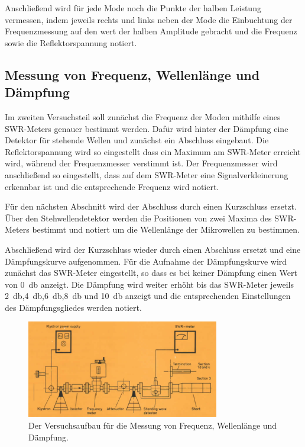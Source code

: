         Anschließend wird für jede Mode noch die Punkte der halben Leistung vermessen, indem jeweils rechts und links neben der Mode die Einbuchtung der Frequenzmessung auf den wert der halben Amplitude gebracht und die Frequenz sowie die Reflektorspannung notiert.
    \subsection{Messung von Frequenz, Wellenlänge und Dämpfung}
        Im zweiten Versuchsteil soll zunächst die Frequenz der Moden mithilfe eines SWR-Meters genauer bestimmt werden.
        Dafür wird hinter der Dämpfung eine Detektor für stehende Wellen und zunächst ein Abschluss eingebaut.
        Die Reflektorspannung wird so eingestellt dass ein Maximum am SWR-Meter erreicht wird, während der Frequenzmesser verstimmt ist.
        Der Frequenzmesser wird anschließend so eingestellt, dass auf dem SWR-Meter eine Signalverkleinerung erkennbar ist und die entsprechende Frequenz wird notiert.

        Für den nächsten Abschnitt wird der Abschluss durch einen Kurzschluss ersetzt.
        Über den Stehwellendetektor werden die Positionen von zwei Maxima des SWR-Meters bestimmt und notiert um die Wellenlänge der Mikrowellen zu bestimmen.

        Abschließend wird der Kurzschluss wieder durch einen Abschluss ersetzt und eine Dämpfungskurve aufgenommen.
        Für die Aufnahme der Dämpfungskurve wird zunächst das SWR-Meter eingestellt, so dass es bei keiner Dämpfung einen Wert von \SI{0}{\decibel} anzeigt.
        Die Dämpfung wird weiter erhöht bis das SWR-Meter jeweils \SI{2}{\decibel},\SI{4}{\decibel},\SI{6}{\decibel},\SI{8}{\decibel} und \SI{10}{\decibel} anzeigt und die entsprechenden Einstellungen des Dämpfungsgliedes werden notiert.
        \begin{figure}[H]
            \centering
            \includegraphics[width = 0.75\textwidth]{bilder/Aufbau_Teil2.png}
            \caption{Der Versuchsaufbau für die Messung von Frequenz, Wellenlänge und Dämpfung.}
            \label{fig:Teil2}
        \end{figure}
